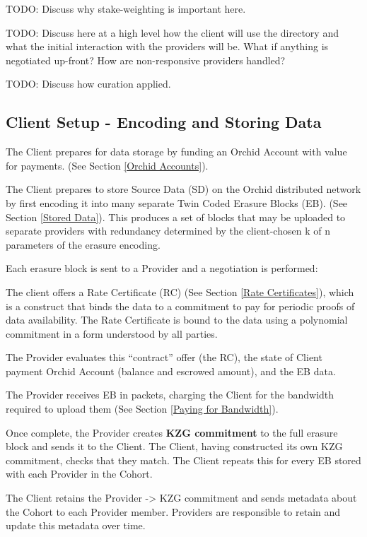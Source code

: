 \documentclass{article}
\begin{document}
TODO: Discuss why stake-weighting is important here.  

TODO: Discuss here at a high level how the client will use the directory and what the initial interaction with the providers will be.  What if anything is negotiated up-front?  How are non-responsive providers handled?

TODO: Discuss how curation applied.


\subsection{Client Setup - Encoding and Storing Data}

The Client prepares for data storage by funding an Orchid Account with value for payments. (See Section \ref{Orchid Accounts}).


The Client prepares to store Source Data (SD) 
on the Orchid distributed network by first encoding it into many separate Twin Coded Erasure Blocks (EB).  (See Section \ref{Stored Data}).  This produces a set of blocks that may be uploaded to separate providers with redundancy determined by the client-chosen k of n parameters of the erasure encoding.

Each erasure block is sent to a Provider and a negotiation is performed:  

The client offers a Rate Certificate (RC) (See Section \ref{Rate Certificates}), which is a construct that binds the data to a commitment to pay for periodic proofs of data availability.  The Rate Certificate is bound to the data using a polynomial commitment in a form understood by all parties. 

The Provider evaluates this “contract” offer (the RC), the state of Client payment Orchid Account (balance and escrowed amount), and the EB data.

The Provider receives EB in packets, charging the Client for the  bandwidth required to upload them (See Section \ref{Paying for Bandwidth}). 

Once complete, the Provider creates \textbf{KZG commitment} to the full erasure block and sends it to the Client.  The Client, having constructed its own KZG commitment, checks that they match. The Client repeats this for every EB stored with each Provider in the Cohort. 

The Client retains the {Provider -> KZG} commitment and sends metadata about the Cohort
to each Provider member. Providers are responsible to retain and update this metadata over time.
\end{document}
